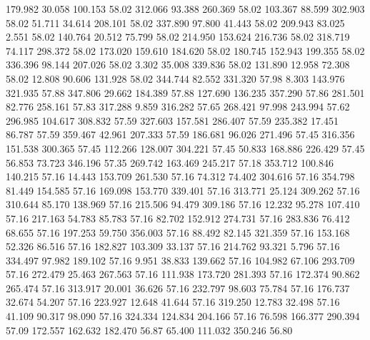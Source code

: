  179.982   30.058  100.153        58.02
 312.066   93.388  260.369        58.02
 103.367   88.599  302.903        58.02
  51.711   34.614  208.101        58.02
 337.890   97.800   41.443        58.02
 209.943   83.025    2.551        58.02
 140.764   20.512   75.799        58.02
 214.950  153.624  216.736        58.02
 318.719   74.117  298.372        58.02
 173.020  159.610  184.620        58.02
 180.745  152.943  199.355        58.02
 336.396   98.144  207.026        58.02
   3.302   35.008  339.836        58.02
 131.890   12.958   72.308        58.02
  12.808   90.606  131.928        58.02
 344.744   82.552  331.320        57.98
   8.303  143.976  321.935        57.88
 347.806   29.662  184.389        57.88
 127.690  136.235  357.290        57.86
 281.501   82.776  258.161        57.83
 317.288    9.859  316.282        57.65
 268.421   97.998  243.994        57.62
 296.985  104.617  308.832        57.59
 327.603  157.581  286.407        57.59
 235.382   17.451   86.787        57.59
 359.467   42.961  207.333        57.59
 186.681   96.026  271.496        57.45
 316.356  151.538  300.365        57.45
 112.266  128.007  304.221        57.45
  50.833  168.886  226.429        57.45
  56.853   73.723  346.196        57.35
 269.742  163.469  245.217        57.18
 353.712  100.846  140.215        57.16
  14.443  153.709  261.530        57.16
  74.312   74.402  304.616        57.16
 354.798   81.449  154.585        57.16
 169.098  153.770  339.401        57.16
 313.771   25.124  309.262        57.16
 310.644   85.170  138.969        57.16
 215.506   94.479  309.186        57.16
  12.232   95.278  107.410        57.16
 217.163   54.783   85.783        57.16
  82.702  152.912  274.731        57.16
 283.836   76.412   68.655        57.16
 197.253   59.750  356.003        57.16
  88.492   82.145  321.359        57.16
 153.168   52.326   86.516        57.16
 182.827  103.309   33.137        57.16
 214.762   93.321    5.796        57.16
 334.497   97.982  189.102        57.16
   9.951   38.833  139.662        57.16
 104.982   67.106  293.709        57.16
 272.479   25.463  267.563        57.16
 111.938  173.720  281.393        57.16
 172.374   90.862  265.474        57.16
 313.917   20.001   36.626        57.16
 232.797   98.603   75.784        57.16
 176.737   32.674   54.207        57.16
 223.927   12.648   41.644        57.16
 319.250   12.783   32.498        57.16
  41.109   90.317   98.090        57.16
 324.334  124.834  204.166        57.16
  76.598  166.377  290.394        57.09
 172.557  162.632  182.470        56.87
  65.400  111.032  350.246        56.80
